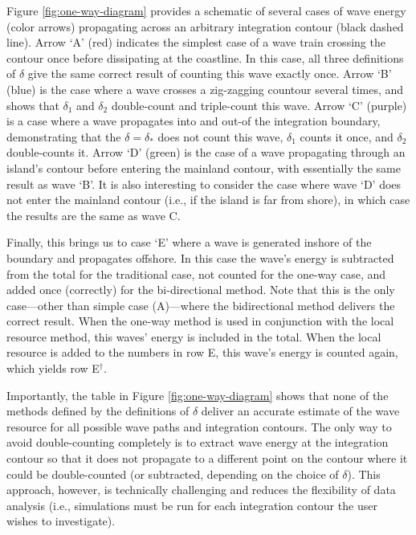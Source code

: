 Figure \ref{fig:one-way-diagram} provides a schematic of several cases of wave energy (color arrows) propagating across an arbitrary integration contour (black dashed line). Arrow `A' (red) indicates the simplest case of a wave train crossing the contour once before dissipating at the coastline. In this case, all three definitions of $\delta$ give the same correct result of counting this wave exactly once. Arrow `B' (blue) is the case where a wave crosses a zig-zagging countour several times, and shows that $\delta_1$ and $\delta_2$ double-count and triple-count this wave. Arrow `C' (purple) is a case where a wave propagates into and out-of the integration boundary, demonstrating that the $\delta = \delta_*$ does not count this wave, $\delta_1$ counts it once, and $\delta_2$ double-counts it. Arrow `D' (green) is the case of a wave propagating through an island's contour before entering the mainland contour, with essentially the same result as wave `B'. It is also interesting to consider the case where wave `D' does not enter the mainland contour (i.e., if the island is far from shore), in which case the results are the same as wave C.

Finally, this brings us to case `E' where a wave is generated inshore of the boundary and propagates offshore. In this case the wave's energy is subtracted from the total for the traditional case, not counted for the one-way case, and added once (correctly) for the bi-directional method. Note that this is the only case—other than simple case (A)—where the bidirectional method delivers the correct result. When the one-way method is used in conjunction with the local resource method, this waves' energy is included in the total.
When the local resource is added to the numbers in row E, this wave's energy is counted again, which yields row E$^\dagger$.

Importantly, the table in Figure \ref{fig:one-way-diagram} shows that none of the methods defined by the definitions of $\delta$ deliver an accurate estimate of the wave resource for all possible wave paths and integration contours. The only way to avoid double-counting completely is to extract wave energy at the integration contour so that it does not propagate to a different point on the contour where it could be double-counted (or subtracted, depending on the choice of $\delta$). This approach, however, is technically challenging and reduces the flexibility of data analysis (i.e., simulations must be run for each integration contour the user wishes to investigate).

